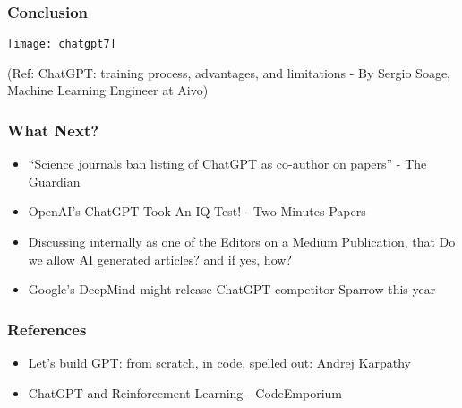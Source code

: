 \begin{frame}[fragile]\frametitle{Conclusion}



			\begin{center}
			\texttt{[image: chatgpt7]}
			
			\end{center}		
			
			{\tiny (Ref: ChatGPT: training process, advantages, and limitations - By Sergio Soage, Machine Learning Engineer at Aivo)}
			

\end{frame}

\begin{frame}[fragile]\frametitle{What Next?}


\begin{itemize}
\item ``Science journals ban listing of ChatGPT as co-author on papers'' - The Guardian
\item OpenAI’s ChatGPT Took An IQ Test! - Two Minutes Papers
\item Discussing internally as one of the Editors on a Medium Publication, that Do we allow AI generated articles? and if yes, how?
\item Google’s DeepMind might release ChatGPT competitor Sparrow this year
\end{itemize}	 

\end{frame}


\begin{frame}[fragile]\frametitle{References}
		\begin{itemize}
		\item Let's build GPT: from scratch, in code, spelled out: Andrej Karpathy
		\item ChatGPT and Reinforcement Learning - CodeEmporium
		\end{itemize}
\end{frame}
